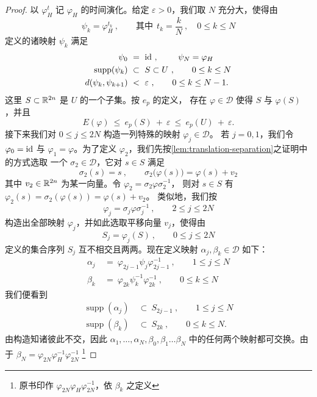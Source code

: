 \begin{proof}
以 $\varphi_{H}^{t}$ 记\trMapping{} $\varphi_{H}$ 的时间演化。给定%
$\varepsilon>0$，我们取 $N$ 充分大，使得由
\[
\psi_{k}=\varphi_{H}^{t_{k}}\ ,\qquad\text{其中}\ \ t_{k}=\frac{k}{N}\ ,\quad 0\leq k\leq N
\]
定义的诸映射 $\psi_{k}$ 满足
\begin{align*}
\psi_{0}\ &=\ \mathrm{id}\ ,\qquad\ \psi_{N}=\varphi_{H}\\
\operatorname{supp}(\psi_{k})\ &\subset\ S\subset U\ ,\qquad 0\leq k\leq N\\
d(\psi_{k},\psi_{k+1})\ &<\ \varepsilon\ ,\qquad 0\leq k\leq N-1.
\end{align*}
这里 $S\subset\mathbb{R}^{2n}$ 是 $U$ 的一个\trBounded{}子集。按 $e_{p}$ 的定义，%
存在 $\varphi\in\mathcal{D}$ 使得 $S$ 与 $\varphi(S)$ \trProperlySeparated，并且
\[
E(\varphi)\ \leq\ e_{p}(S)\ +\ \varepsilon\ \leq\ e_{p}(U)\ +\ \varepsilon.
\]
接下来我们对 $0\leq j\leq2N$ 构造一列特殊的映射 $\varphi_{j}\in\mathcal{D}$。%
若 $j=0,1$，我们令 $\varphi_{0}=\mathrm{id}$ 与 $\varphi_{1}=\varphi$。为了定义%
$\varphi_{2}$，我们先按\cref{lem:translation-separation}之证明中的方式选取%
一个\trMapping{} $\sigma_{2}\in\mathcal{D}$，它对 $s\in S$ 满足
\[
\sigma_{2}(s)=s\ ,\qquad \sigma_{2}\bigl(\varphi(s)\bigr)=\varphi(s)+v_{2}
\]
其中 $v_{2}\in\mathbb{R}^{2n}$ 为某一向量。令 $\varphi_{2}=\sigma_{2}\varphi\sigma_{2}^{-1}$，%
则对 $s\in S$ 有 $\varphi_{2}(s)=\sigma_{2}(\varphi(s))=\varphi(s)+v_{2}$。%
类似地，我们按
\[
\varphi_{j}=\sigma_{j}\varphi\sigma_{j}^{-1}\ ,\qquad 2\leq j\leq2N
\]
构造出全部映射 $\varphi_{j}$，并如此选取平移向量 $v_{j}$，使得由
\[
S_{j}=\varphi_{j}(S)\ ,\qquad 0\leq j\leq2N
\]
定义的集合序列 $S_{j}$ 互不相交且两两\trProperlySeparated。现在定义映射%
$\alpha_{j},\beta_{k}\in\mathcal{D}$ 如下：
\begin{align*}
\alpha_{j}\ &=\ \varphi_{2j-1}\psi_{j}\varphi_{2j-1}^{-1}\ ,\qquad 1\leq j\leq N\\
\beta_{k}\ &=\ \varphi_{2k}\psi_{k}^{-1}\varphi_{2k}^{-1}\ ,\qquad 0\leq k\leq N
\end{align*}
我们便看到
\begin{align*}
\operatorname{supp}(\alpha_{j})\ &\subset\ S_{2j-1}\ ,\qquad 1\leq j\leq N\\
\operatorname{supp}(\beta_{k})\ &\subset\ S_{2k}\ ,\qquad 0\leq k\leq N.
\end{align*}
由构造知诸\trSupport{}彼此不交，因此 $\alpha_{1},\dots,\alpha_{N},\beta_{0},\beta_{1}\dots\beta_{N}$%
中的任何两个映射都可交换。由于 $\beta_{N}=\varphi_{2N}\varphi_{H}^{-1}\varphi_{2N}^{-1}$%
\footnote{原书印作 $\varphi_{2N}\varphi_{H}\varphi_{2N}^{-1}$，依 $\beta_{k}$ 之定义%
}
\end{proof}
